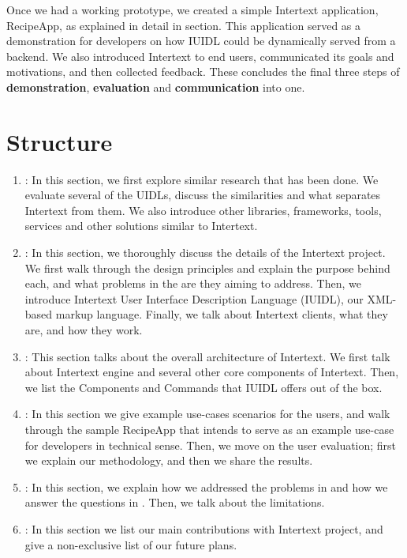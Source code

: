 Once we had a working prototype, we created a simple Intertext application, RecipeApp, as explained in detail in  section. This application served as a demonstration for developers on how IUIDL could be dynamically served from a backend. We also introduced Intertext to end users, communicated its goals and motivations, and then collected feedback. These concludes the final three steps of \textbf{demonstration}, \textbf{evaluation} and \textbf{communication} into one.

\section{Structure} \label{structure}

\begin{enumerate}
    
    \item \textbf{}: In this section, we first explore similar research that has been done. We evaluate several of the UIDLs, discuss the similarities and what separates Intertext from them. We also introduce other libraries, frameworks, tools, services and other solutions similar to Intertext.

    \item \textbf{}: In this section, we thoroughly discuss the details of the Intertext project. We first walk through the design principles and explain the purpose behind each, and what problems in the  are they aiming to address. Then, we introduce Intertext User Interface Description Language (IUIDL), our XML-based markup language. Finally, we talk about Intertext clients, what they are, and how they work.

    \item \textbf{}: This section talks about the overall architecture of Intertext. We first talk about Intertext engine and several other core components of Intertext. Then, we list the Components and Commands that IUIDL offers out of the box.
    
    \item \textbf{}: In this section we give example use-cases scenarios for the users, and walk through the sample RecipeApp that intends to serve as an example use-case for developers in technical sense. Then, we move on the user evaluation; first we explain our methodology, and then we share the results.

    \item \textbf{}: In this section, we explain how we addressed the problems in  and how we answer the questions in . Then, we talk about the limitations.

    \item \textbf{}: In this section we list our main contributions with Intertext project, and give a non-exclusive list of our future plans.
    
\end{enumerate}